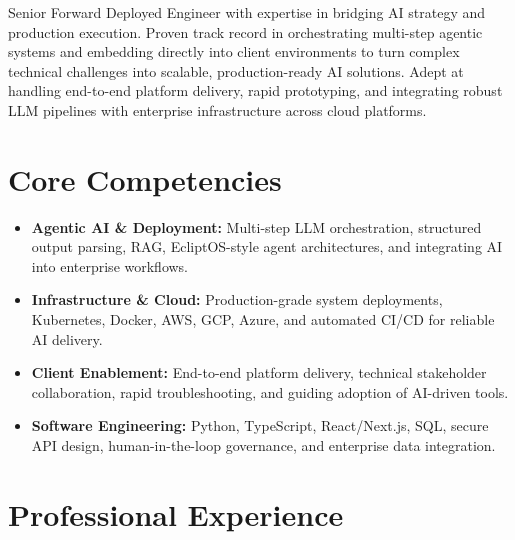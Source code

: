 \documentclass[11pt,a4paper,sans]{moderncv}
\begin{document}
\makecvtitle

Senior Forward Deployed Engineer with expertise in bridging AI strategy and production execution. Proven track record in orchestrating multi-step agentic systems and embedding directly into client environments to turn complex technical challenges into scalable, production-ready AI solutions. Adept at handling end-to-end platform delivery, rapid prototyping, and integrating robust LLM pipelines with enterprise infrastructure across cloud platforms.

\section{Core Competencies}
\begin{itemize}
\item \textbf{Agentic AI \& Deployment:} Multi-step LLM orchestration, structured output parsing, RAG, EcliptOS-style agent architectures, and integrating AI into enterprise workflows.
\item \textbf{Infrastructure \& Cloud:} Production-grade system deployments, Kubernetes, Docker, AWS, GCP, Azure, and automated CI/CD for reliable AI delivery.
\item \textbf{Client Enablement:} End-to-end platform delivery, technical stakeholder collaboration, rapid troubleshooting, and guiding adoption of AI-driven tools.
\item \textbf{Software Engineering:} Python, TypeScript, React/Next.js, SQL, secure API design, human-in-the-loop governance, and enterprise data integration.
\end{itemize}

\section{Professional Experience}
\end{document}
